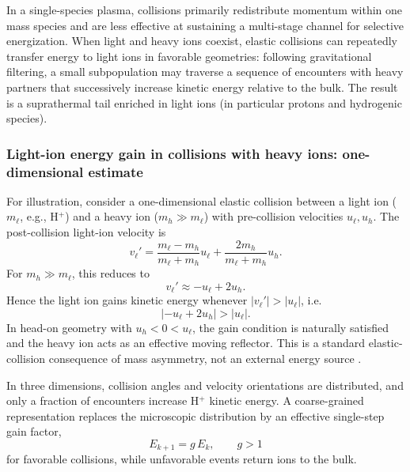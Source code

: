 \documentclass[11pt,a4paper]{article}
\begin{document}
In a single-species plasma, collisions primarily redistribute momentum within one mass species and are less effective at sustaining a multi-stage channel for selective energization. When light and heavy ions coexist, elastic collisions can repeatedly transfer energy to light ions in favorable geometries: following gravitational filtering, a small subpopulation may traverse a sequence of encounters with heavy partners that successively increase kinetic energy relative to the bulk. The result is a suprathermal tail enriched in light ions (in particular protons and hydrogenic species).

\subsubsection{Light-ion energy gain in collisions with heavy ions: one-dimensional estimate}
For illustration, consider a one-dimensional elastic collision between a light ion ($m_\ell$, e.g., H$^+$) and a heavy ion ($m_h\gg m_\ell$) with pre-collision velocities $u_\ell,u_h$. The post-collision light-ion velocity is
\begin{equation}
v_\ell'=\frac{m_\ell-m_h}{m_\ell+m_h}u_\ell+\frac{2m_h}{m_\ell+m_h}u_h.
\end{equation}
For $m_h\gg m_\ell$, this reduces to
\begin{equation}
v_\ell'\approx -u_\ell+2u_h.
\end{equation}
Hence the light ion gains kinetic energy whenever $|v_\ell'|>|u_\ell|$, i.e.
\begin{equation}
|{-}u_\ell+2u_h|>|u_\ell|.
\end{equation}
In head-on geometry with $u_h<0<u_\ell$, the gain condition is naturally satisfied and the heavy ion acts as an effective moving reflector. This is a standard elastic-collision consequence of mass asymmetry, not an external energy source \cite{ChenPlasmaPhysics1984}.

In three dimensions, collision angles and velocity orientations are distributed, and only a fraction of encounters increase H$^+$ kinetic energy. A coarse-grained representation replaces the microscopic distribution by an effective single-step gain factor,
\begin{equation}
E_{k+1}=g\,E_k,\qquad g>1
\end{equation}
for favorable collisions, while unfavorable events return ions to the bulk.
\end{document}
